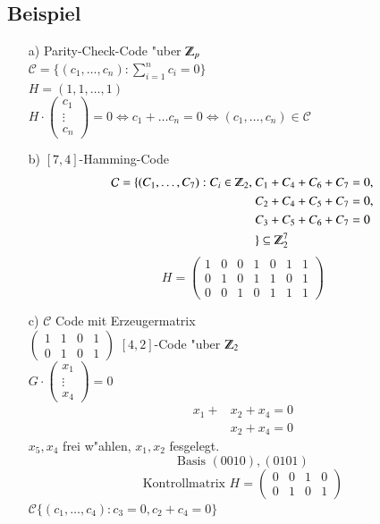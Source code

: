 \subsection{Beispiel}
\begin{itemize}
	\item [a)] Parity-Check-Code "uber $\Z_p$ \\
	$\mathcal{C} = \lbrace (c_1,\ldots,c_n): \sum^n_{i=1}{c_i}=0 \rbrace$\\ %
	$H=(1,1,\ldots,1)$\\
	$H \cdot
	\begin{pmatrix}
	c_1 \\
	\vdots \\
	c_n
	\end{pmatrix}
	= 0 \Leftrightarrow c_1 + \ldots c_n = 0 \Leftrightarrow (c_1,\ldots,c_n) \in \mathcal{C}$
	\item [b)] $[7,4]$-Hamming-Code
	\begin{align*}
	\mathcal{C} = \lbrace (C_1,\ldots,C_7) : C_i \in \Z_2,\ &C_1 + C_4 + C_6 + C_7 = 0,\\
										&C_2 + C_4 + C_5 + C_7 = 0,\\
										&C_3 + C_5 + C_6 + C_7 = 0\\
										 &\rbrace \subseteq \Z_2^7
	\end{align*}
	\[	H=
		\begin{pmatrix}
			1 & 0 & 0 & 1 & 0 & 1 & 1\\
			0 & 1 & 0 & 1 & 1 & 0 & 1\\
			0 & 0 & 1 & 0 & 1 & 1 & 1
		\end{pmatrix}
	\]
	\item [c)] $\mathcal{C}$ Code mit Erzeugermatrix\\
	$
	\begin{pmatrix}
		1 & 1 & 0 & 1\\
		0 & 1 & 0 & 1
	\end{pmatrix}$
	 $[4,2]$-Code "uber $\Z_2$\\
	 $G \cdot
	 \begin{pmatrix}
	 x_1 \\
	 \vdots \\
	 x_4
	 \end{pmatrix}
	 =0$
	 \begin{align*}
	 	x_1+&x_2 + x_4=0\\
	 	&x_2 + x_4 =0
	\end{align*}
	$x_5,x_4$ frei w"ahlen, $x_1,x_2$ fesgelegt.\\
	\[
		\text{Basis }
		(0 0 1 0), (0 1 0 1)
	\]	
	\[
		\text{Kontrollmatrix }
		H=
		\begin{pmatrix}
			0 & 0 & 1 & 0 \\
			0 & 1 & 0 & 1
		\end{pmatrix}
	\]
	$\mathcal{C} \lbrace (c_1,\ldots,c_4) : c_3=0,c_2+c_4=0\rbrace$	
\end{itemize}

